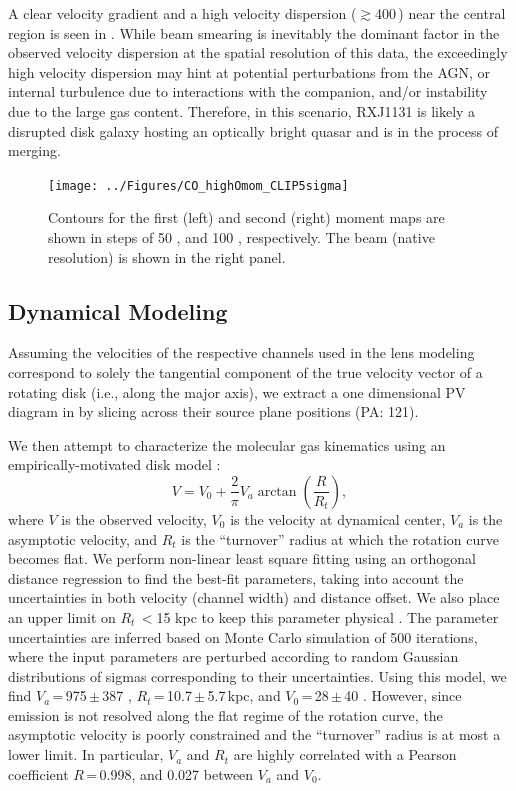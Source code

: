 \documentclass[]{emulateapj}
\begin{document}
A clear velocity gradient and a high
velocity dispersion ($\gtrsim$400\,\kms) near the central region
is seen in . While beam smearing is inevitably the
dominant factor in the observed velocity dispersion
at the spatial resolution of this data, the exceedingly
high velocity dispersion may hint
at potential perturbations from the AGN, or internal turbulence due to
interactions with the companion, and/or instability due to the large gas
content. 
Therefore, in this scenario, RXJ1131 is 
likely a disrupted disk galaxy hosting an optically
bright quasar and is in the process of merging.

\begin{figure}[!htbp]
\centering
\texttt{[image: ../Figures/CO\_highOmom\_CLIP5sigma]}
\caption{
Contours for the first (left) and second (right) moment maps are shown in steps of
50 \kms, and 100 \kms, respectively. The beam (native resolution) is shown in the right panel.
\label{fig:CO21highO}}
\end{figure}

\subsection{\bco Dynamical Modeling} \label{sec:dynamics} %
Assuming the velocities of the respective channels used in the
lens modeling correspond to solely the tangential component of the
true velocity vector of a rotating disk (i.e., along the major axis),
we extract a one dimensional PV diagram in 
by slicing across their source plane positions (PA: 121\degr).

We then attempt to characterize the molecular gas kinematics using an
empirically-motivated disk model \citep[\eg][]{Courteau97a,Puech08a,Miller11a}:
\begin{equation}
V = V_0 + \frac{2}{\pi} V_{a} \arctan(\frac{R}{R_{t}}),
\end{equation}
where $V$ is the observed velocity, $V_0$ is the velocity at dynamical center,
$V_{a}$ is the asymptotic velocity, and $R_{t}$ is the ``turnover''
radius at which the rotation curve becomes flat.
We perform non-linear least square fitting using an orthogonal distance
regression to find the best-fit parameters,
taking into account the uncertainties in both velocity (channel width) and
distance offset. We also place an upper limit on $R_{t}$\,$<$15 kpc
to keep this parameter physical \citep[\eg][]{Puech08a,Miller11a}.
The parameter uncertainties are inferred based on Monte Carlo simulation
of 500 iterations, where the input parameters are perturbed
according to random Gaussian distributions of sigmas
corresponding to their uncertainties.
Using this model, we find $V_{a}$\,=\,975\,$\pm$\,387 \kms,
$R_{t}$\,=\,10.7\,$\pm$\,5.7\,kpc, and $V_0$\,=\,28\,$\pm$\,40 \kms.
However, since emission is not resolved along the flat regime
of the rotation curve, the asymptotic velocity is poorly constrained and
the ``turnover'' radius is at most a lower limit.
In particular, $V_{a}$ and $R_{t}$ are highly correlated with a
Pearson coefficient $R$\,=\,0.998, and 0.027 between $V_{a}$ and $V_0$.
\end{document}
